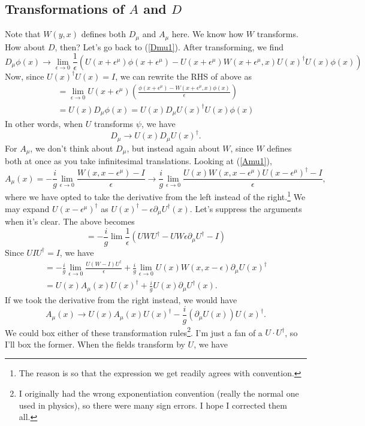 \documentclass[main.tex]{subfiles}
\begin{document}
\subsection{Transformations of $A$ and $D$}
Note that $W(y,x)$ defines both $D_\mu$ and $A_\mu$ here. We know how $W$ transforms. How about $D$, then? Let's go back to (\ref{Dmu1}). After transforming, we find
\[
D_\mu \phi (x) \to \lim_{\epsilon \to 0} \frac{1}{\epsilon} \left( U(x + \epsilon^\mu) \phi(x + \epsilon^\mu) - U(x + \epsilon^\mu) W(x + \epsilon^\mu,x) U(x)^\dagger U(x) \phi(x) \right)
\]
Now, since $U(x)^\dagger U(x) = I$, we can rewrite the RHS of above as 
\begin{align*}
=\lim_{\epsilon \to 0} U(x + \epsilon^\mu) \left(
\frac{\phi(x + \epsilon^\mu) - W(x + \epsilon^\mu, x) \phi(x)}{\epsilon}
\right) \\ = 
U(x) D_\mu \phi(x) = U(x) D_\mu U(x)^\dagger U(x) \phi(x)
\end{align*}
In other words, when $U$ transforms $\psi$, we have
\begin{equation}
\boxed{D_\mu \to U(x) D_\mu U(x)^\dagger}.
\end{equation}
For $A_\mu$, we don't think about $D_\mu$, but instead again about $W$, since $W$ defines both at once as you take infinitesimal translations. Looking at (\ref{Amu1}),
\[
A_\mu (x) = - \frac{i}{g} \lim_{\epsilon \to 0} \frac{W(x,x - \epsilon^\mu) - I}{\epsilon} \to \frac{i}{g} \lim_{\epsilon \to 0} \frac{U(x) W(x,x- \epsilon^\mu) U(x-\epsilon^\mu)^\dagger - I}{\epsilon},
\]
where we have opted to take the derivative from the left instead of the right.\footnote{The reason is so that the expression we get readily agrees with convention.} We may expand $U(x - \epsilon^\mu)^\dagger$ as $U(x)^\dagger - \epsilon \partial_\mu U^\dagger (x)$. Let's suppress the arguments when it's clear. The above becomes 
\[
= - \frac{i}{g} \lim \frac{1}{\epsilon} \left(
U W U^\dagger - UW \epsilon \partial_\mu U^\dagger - I
\right)
\]
Since $U I U^\dagger = I$, we have
\begin{align*}
= -\frac{i}{g} \lim_{\epsilon \to 0} \frac{U (W - I)U^\dagger}{\epsilon} + \frac{i}{g} \lim_{\epsilon \to 0} U(x) W(x,x- \epsilon)\partial_\mu U(x)^\dagger \\ =
U (x) A_\mu (x) U(x)^\dagger + \frac{i}{g} U(x) \partial_\mu U^\dagger (x).
\end{align*}
If we took the derivative from the right instead, we would have
\[
A_\mu (x) \to U(x) A_\mu (x) U(x)^\dagger - \frac{i}{g} (\partial_\mu U (x)) U(x)^\dagger.
\]
We could box either of these transformation rules\footnote{I originally had the wrong exponentiation convention (really the normal one used in physics), so there were many sign errors. I hope I corrected them all.}. I'm just a fan of a $U \cdot U^\dagger$, so I'll box the former. When the fields transform by $U$, we have
\end{document}
